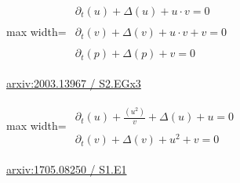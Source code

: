 \documentclass[10pt,a4paper]{article}
\begin{document}
\begin{minipage}{\linewidth}
\begin{center}\begin{adjustbox}{max width=\linewidth}$\displaystyle\begin{gathered}\begin{gathered}\partial_{t}(u)+\Delta(u)+u\cdot v=0\end{gathered}\\[5pt]\begin{gathered}\partial_{t}(v)+\Delta(v)+u\cdot v+v=0\end{gathered}\\[5pt]\begin{gathered}\partial_{t}(p)+\Delta(p)+v=0\end{gathered}\end{gathered}$\end{adjustbox}\end{center}
{\small \href{https://arxiv.org/html/2003.13967#S2.EGx3}{arxiv:2003.13967 / S2.EGx3}}\par
\end{minipage}\par\vspace{7mm}

\begin{minipage}{\linewidth}
\begin{center}\begin{adjustbox}{max width=\linewidth}$\displaystyle\begin{gathered}\begin{gathered}\partial_{t}(u)+\frac{(u^{2})}{v}+\Delta(u)+u=0\end{gathered}\\[5pt]\begin{gathered}\partial_{t}(v)+\Delta(v)+u^{2}+v=0\end{gathered}\end{gathered}$\end{adjustbox}\end{center}
{\small \href{https://arxiv.org/html/1705.08250#S1.E1}{arxiv:1705.08250 / S1.E1}}\par
\end{minipage}\par\vspace{7mm}
\end{document}
